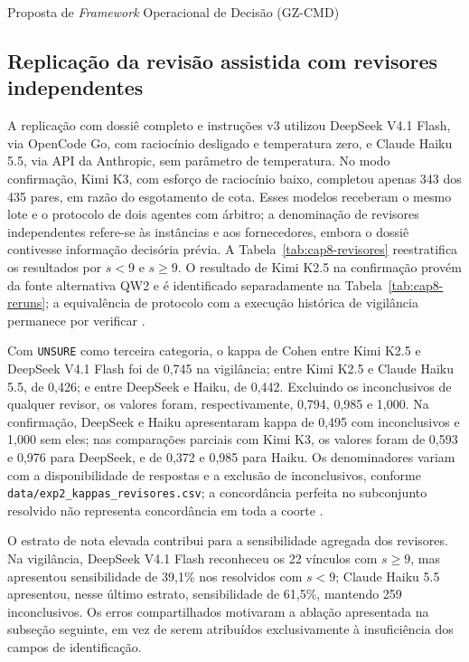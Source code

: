 \begin{chapter}{Proposta de \textit{Framework} Operacional de Decisão (GZ-CMD)}
\subsection{Replicação da revisão assistida com revisores independentes}
\label{sec:cap8-revisores}

A replicação com dossiê completo e instruções v3 utilizou DeepSeek V4.1 Flash, via OpenCode Go, com raciocínio desligado e temperatura zero, e Claude Haiku 5.5, via API da Anthropic, sem parâmetro de temperatura. No modo confirmação, Kimi K3, com esforço de raciocínio baixo, completou apenas 343 dos 435 pares, em razão do esgotamento de cota. Esses modelos receberam o mesmo lote e o protocolo de dois agentes com árbitro; a denominação de revisores independentes refere-se às instâncias e aos fornecedores, embora o dossiê contivesse informação decisória prévia. A Tabela~\ref{tab:cap8-revisores} reestratifica os resultados por $s<9$ e $s\geq9$. O resultado de Kimi K2.5 na confirmação provém da fonte alternativa QW2 e é identificado separadamente na Tabela~\ref{tab:cap8-reruns}; a equivalência de protocolo com a execução histórica de vigilância permanece por verificar \cite{Jardim2026phdrepo}.



Com \texttt{UNSURE} como terceira categoria, o kappa de Cohen entre Kimi K2.5 e DeepSeek V4.1 Flash foi de 0,745 na vigilância; entre Kimi K2.5 e Claude Haiku 5.5, de 0,426; e entre DeepSeek e Haiku, de 0,442. Excluindo os inconclusivos de qualquer revisor, os valores foram, respectivamente, 0,794, 0,985 e 1,000. Na confirmação, DeepSeek e Haiku apresentaram kappa de 0,495 com inconclusivos e 1,000 sem eles; nas comparações parciais com Kimi K3, os valores foram de 0,593 e 0,976 para DeepSeek, e de 0,372 e 0,985 para Haiku. Os denominadores variam com a disponibilidade de respostas e a exclusão de inconclusivos, conforme \texttt{data/exp2\_kappas\_revisores.csv}; a concordância perfeita no subconjunto resolvido não representa concordância em toda a coorte \cite{Jardim2026phdrepo}.

O estrato de nota elevada contribui para a sensibilidade agregada dos revisores. Na vigilância, DeepSeek V4.1 Flash reconheceu os 22 vínculos com $s\geq9$, mas apresentou sensibilidade de 39,1\% nos resolvidos com $s<9$; Claude Haiku 5.5 apresentou, nesse último estrato, sensibilidade de 61,5\%, mantendo 259 inconclusivos. Os erros compartilhados motivaram a ablação apresentada na subseção seguinte, em vez de serem atribuídos exclusivamente à insuficiência dos campos de identificação.


\end{chapter}
